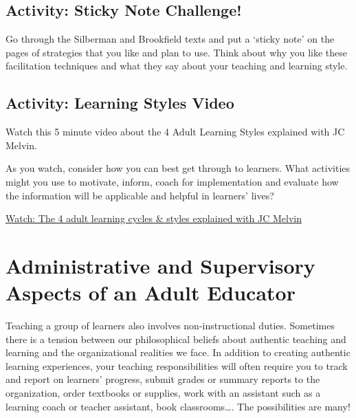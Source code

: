 \documentclass[
]{book}
\begin{document}
\hypertarget{activity-sticky-note-challenge}{%
\subsection*{Activity: Sticky Note Challenge!}\label{activity-sticky-note-challenge}}

\begin{reflect}
Go through the Silberman and Brookfield texts and put a `sticky note' on the pages of strategies that you like and plan to use. Think about why you like these facilitation techniques and what they say about your teaching and learning style.
\end{reflect}

\hypertarget{activity-learning-styles-video}{%
\subsection*{Activity: Learning Styles Video}\label{activity-learning-styles-video}}

\begin{reflect}
Watch this 5 minute video about the 4 Adult Learning Styles explained with JC Melvin.

As you watch, consider how you can best get through to learners. What activities might you use to motivate, inform, coach for implementation and evaluate how the information will be applicable and helpful in learners' lives?

\href{https://www.youtube.com/watch?v=5mApEVWZESA}{Watch: The 4 adult learning cycles \& styles explained with JC Melvin}
\end{reflect}

\hypertarget{administrative-and-supervisory-aspects-of-an-adult-educator}{%
\section{Administrative and Supervisory Aspects of an Adult Educator}\label{administrative-and-supervisory-aspects-of-an-adult-educator}}

Teaching a group of learners also involves non-instructional duties. Sometimes there is a tension between our philosophical beliefs about authentic teaching and learning and the organizational realities we face. In addition to creating authentic learning experiences, your teaching responsibilities will often require you to track and report on learners' progress, submit grades or summary reports to the organization, order textbooks or supplies, work with an assistant such as a learning coach or teacher assistant, book classrooms\ldots. The possibilities are many!
\end{document}
